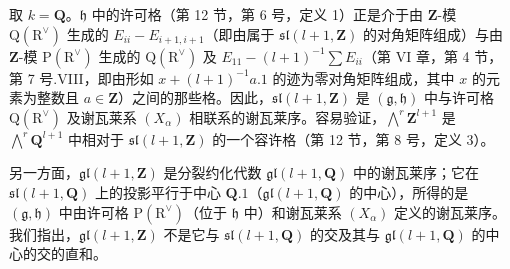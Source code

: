 取 \(k = \mathbf{Q}\)。\(\mathfrak{h}\) 中的许可格（第 12 节，第 6 号，定义 1）正是介于由 \(\mathbf{Z}\)-模 \(\mathrm{Q}(\mathrm{R}^{\vee})\) 生成的 \(E_{ii} - E_{i+1,i+1}\)（即由属于 \(\mathfrak{sl}(l+1,\mathbf{Z})\) 的对角矩阵组成）与由 \(\mathbf{Z}\)-模 \(\mathrm{P}(\mathrm{R}^{\vee})\) 生成的 \(\mathrm{Q}(\mathrm{R}^{\vee})\) 及 \(E_{11} - (l+1)^{-1}\sum E_{ii}\)（第 VI 章，第 4 节，第 7 号.VIII，即由形如 \(x + (l+1)^{-1}a.1\) 的迹为零对角矩阵组成，其中 \(x\) 的元素为整数且 \(a\in\mathbf{Z}\)）之间的那些格。因此，\(\mathfrak{sl}(l+1,\mathbf{Z})\) 是 \((\mathfrak{g},\mathfrak{h})\) 中与许可格 \(\mathrm{Q}(\mathrm{R}^{\vee})\) 及谢瓦莱系 \((X_{\alpha})\) 相联系的谢瓦莱序。容易验证，\(\bigwedge^{r}\mathbf{Z}^{l+1}\) 是 \(\bigwedge^{r}\mathbf{Q}^{l+1}\) 中相对于 \(\mathfrak{sl}(l+1,\mathbf{Z})\) 的一个容许格（第 12 节，第 8 号，定义 3）。

另一方面，\(\mathfrak{gl}(l+1,\mathbf{Z})\) 是分裂约化代数 \(\mathfrak{gl}(l+1,\mathbf{Q})\) 中的谢瓦莱序；它在 \(\mathfrak{sl}(l+1,\mathbf{Q})\) 上的投影平行于中心 \(\mathbf{Q}.1\)（\(\mathfrak{gl}(l+1,\mathbf{Q})\) 的中心），所得的是 \((\mathfrak{g},\mathfrak{h})\) 中由许可格 \(\mathrm{P}(\mathrm{R}^{\vee})\)（位于 \(\mathfrak{h}\) 中）和谢瓦莱系 \((X_{\alpha})\) 定义的谢瓦莱序。我们指出，\(\mathfrak{gl}(l+1,\mathbf{Z})\) 不是它与 \(\mathfrak{sl}(l+1,\mathbf{Q})\) 的交及其与 \(\mathfrak{gl}(l+1,\mathbf{Q})\) 的中心的交的直和。